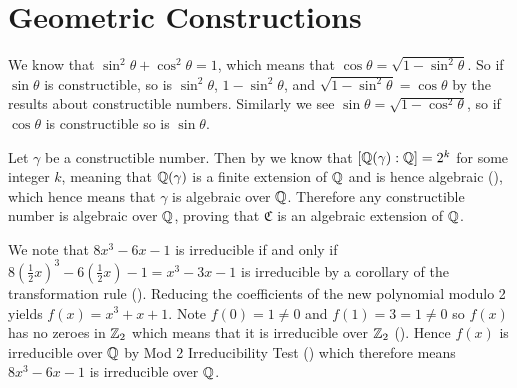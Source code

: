 \section{Geometric Constructions}
\begin{questions}
    \item We know that $\sin^2\theta + \cos^2\theta = 1$, which means that $\cos\theta = \sqrt{1-\sin^2\theta}$. So if $\sin\theta$ is constructible, so is $\sin^2\theta$, $1 - \sin^2\theta$, and $\sqrt{1-\sin^2\theta} = \cos\theta$ by the results about constructible numbers. Similarly we see $\sin\theta = \sqrt{1-\cos^2\theta}$, so if $\cos\theta$ is constructible so is $\sin\theta$.

    \item Let $\gamma$ be a constructible number. Then by  we know that $[\mathbb{Q}(\gamma):\mathbb{Q}] = 2^k$ for some integer $k$, meaning that $\mathbb{Q}(\gamma)$ is a finite extension of $\mathbb{Q}$ and is hence algebraic (), which hence means that $\gamma$ is algebraic over $\mathbb{Q}$. Therefore any constructible number is algebraic over $\mathbb{Q}$, proving that $\mathfrak{C}$ is an algebraic extension of $\mathbb{Q}$.

    \item We note that $8x^3 - 6x - 1$ is irreducible if and only if $8\left(\frac12x\right)^3 - 6\left(\frac12x\right) - 1 = x^3 - 3x - 1$ is irreducible by a corollary of the transformation rule (). Reducing the coefficients of the new polynomial modulo 2 yields $f(x) = x^3 + x + 1$. Note $f(0) = 1 \neq 0$ and $f(1) = 3 = 1 \neq 0$ so $f(x)$ has no zeroes in $\mathbb{Z}_2$ which means that it is irreducible over $\mathbb{Z}_2$ (). Hence $f(x)$ is irreducible over $\mathbb{Q}$ by Mod 2 Irreducibility Test () which therefore means $8x^3 - 6x - 1$ is irreducible over $\mathbb{Q}$.
\end{questions}
